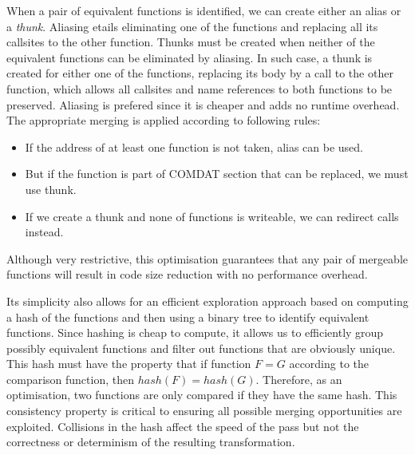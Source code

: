 When a pair of equivalent functions is identified, we can create either
an alias or a \textit{thunk}.
Aliasing etails eliminating one of the functions and replacing all its callsites
to the other function.
Thunks must be created when neither of the equivalent functions can be eliminated
by aliasing.
In such case, a thunk is created for either one of the functions, replacing its
body by a call to the other function, which allows all callsites and name
references to both functions to be preserved.
Aliasing is prefered since it is cheaper and adds no runtime overhead.
The appropriate merging is applied according to following rules:
\begin{itemize}
\item If the address of at least one function is not taken, alias can be used.
\item But if the function is part of COMDAT section that can be replaced, we
must use thunk.
\item If we create a thunk and none of functions is writeable, we can redirect calls
instead.
\end{itemize}
Although very restrictive, this optimisation guarantees that any pair of
mergeable functions will result in code size reduction with no performance
overhead.

Its simplicity also allows for an efficient exploration approach based on computing
a hash of the functions and then using a binary tree to identify equivalent
functions.
Since hashing is cheap to compute, it allows us to efficiently
group possibly equivalent functions and filter out functions
that are obviously unique.
This hash must have the property that if function $F = G$
according to the comparison function, then $hash(F) = hash(G)$.
Therefore, as an optimisation, two functions are only compared if they have the
same hash.
This consistency property is critical to ensuring all possible merging
opportunities are exploited.
Collisions in the hash affect the speed of the pass but not the correctness
or determinism of the resulting transformation.

